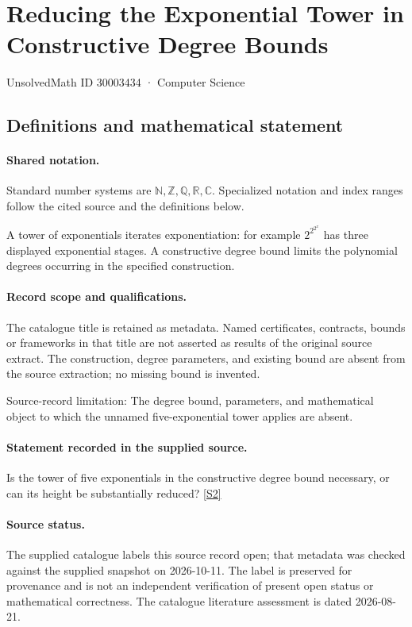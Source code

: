 \documentclass[11pt]{article}
\newcommand{\sref}[2]{\hyperlink{source:#1:#2}{[S#2]}}
\begin{document}
\setcounter{section}{30003433}
\section{Reducing the Exponential Tower in Constructive Degree Bounds}\label{30003434}
{\small\sffamily UnsolvedMath ID 30003434 · Computer Science}
\subsection{Definitions and mathematical statement}

\paragraph{Shared notation.}Standard number systems are $\mathbb N,\mathbb Z,\mathbb Q,\mathbb R,\mathbb C$. Specialized notation and index ranges follow the cited source and the definitions below.


A tower of exponentials iterates exponentiation: for example $2^{2^{2^x}}$ has three displayed exponential stages. A constructive degree bound limits the polynomial degrees occurring in the specified construction.
\paragraph{Record scope and qualifications.}
The catalogue title is retained as metadata. Named certificates, contracts, bounds or frameworks in that title are not asserted as results of the original source extract.
The construction, degree parameters, and existing bound are absent from the source extraction; no missing bound is invented.

Source-record limitation: The degree bound, parameters, and mathematical object to which the unnamed five-exponential tower applies are absent.
\paragraph{Statement recorded in the supplied source.}
Is the tower of five exponentials in the constructive degree bound necessary, or can its height be substantially reduced? \sref{30003434}{2}
\paragraph{Source status.}
The supplied catalogue labels this source record open; that metadata was checked against the supplied snapshot on 2026-10-11. The label is preserved for provenance and is not an independent verification of present open status or mathematical correctness. The catalogue literature assessment is dated 2026-08-21.
\end{document}
